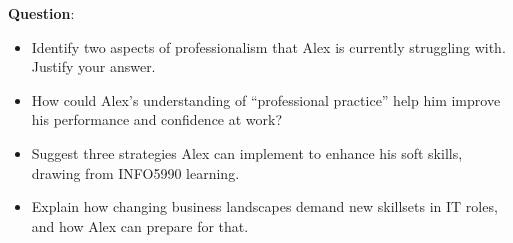 \bigskip

\noindent\textbf{Question}:

\begin{itemize}
    \item Identify two aspects of professionalism that Alex is currently struggling with. Justify your answer.
    \item How could Alex’s understanding of “professional practice” help him improve his performance and confidence at work?
    \item Suggest three strategies Alex can implement to enhance his soft skills, drawing from INFO5990 learning.
    \item Explain how changing business landscapes demand new skillsets in IT roles, and how Alex can prepare for that.
\end{itemize}